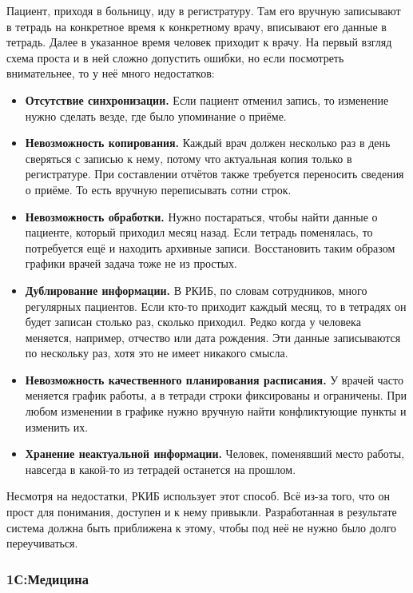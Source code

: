 \documentclass[a4paper,article]{article}
\begin{document}
        Пациент, приходя в больницу, иду в регистратуру. Там его вручную записывают в тетрадь на конкретное время к конкретному врачу, вписывают его данные в тетрадь. Далее в указанное время человек приходит к врачу.
        На первый взгляд схема проста и в ней сложно допустить ошибки, но если посмотреть внимательнее, то у неё много недостатков:

        \begin{itemize}[nolistsep]
            \item \textbf{Отсутствие синхронизации.} Если пациент отменил запись, то изменение нужно сделать везде, где было упоминание о приёме.
            \item \textbf{Невозможность копирования.} Каждый врач должен несколько раз в день сверяться с записью к нему, потому что актуальная копия только в регистратуре. При составлении отчётов также требуется переносить сведения о приёме. То есть вручную переписывать сотни строк.
            \item \textbf{Невозможность обработки.} Нужно постараться, чтобы найти данные о пациенте, который приходил месяц назад. Если тетрадь поменялась, то потребуется ещё и находить архивные записи. Восстановить таким образом графики врачей задача тоже не из простых.
            \item \textbf{Дублирование информации.} В РКИБ, по словам сотрудников, много регулярных пациентов. Если кто-то приходит каждый месяц, то в тетрадях он будет записан столько раз, сколько приходил. Редко когда у человека меняется, например, отчество или дата рождения. Эти данные записываются по нескольку раз, хотя это не имеет никакого смысла.
            \item \textbf{Невозможность качественного планирования расписания.} У врачей часто меняется график работы, а в тетради строки фиксированы и ограничены. При любом изменении в графике нужно вручную найти конфликтующие пункты и изменить их.
            \item \textbf{Хранение неактуальной информации.} Человек, поменявший место работы, навсегда в какой-то из тетрадей останется на прошлом.
        \end{itemize}

        Несмотря на недостатки, РКИБ использует этот способ. Всё из-за того, что он прост для понимания, доступен и к нему привыкли. Разработанная в результате система должна быть приближена к этому, чтобы под неё не нужно было долго переучиваться.

    \subsubsection{1С:Медицина}
\end{document}

